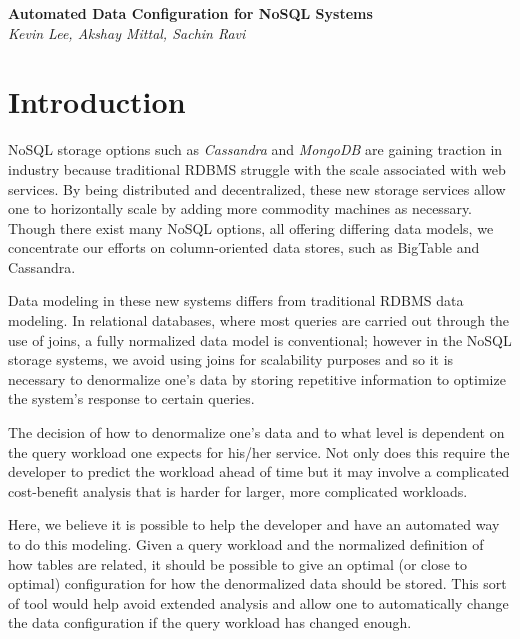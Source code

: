 \documentclass[10pt]{article}
\begin{document}
\pagestyle{plain}

\begin{center}
  \Large\textbf{Automated Data Configuration for NoSQL Systems}\\
  \large\textit{Kevin Lee, Akshay Mittal, Sachin Ravi}
\end{center}

\bigskip

\section{Introduction}
NoSQL storage options such as \emph{Cassandra} and \emph{MongoDB} are gaining traction in industry because traditional
RDBMS struggle with the scale associated with web services. By being distributed and decentralized, these new storage 
services allow one to horizontally scale by adding more commodity machines as necessary. Though there exist many NoSQL
options, all offering differing data models, we concentrate our efforts on column-oriented data stores, such as BigTable
and Cassandra.

Data modeling in these new systems differs from traditional RDBMS data modeling. In relational databases, where most queries
are carried out through the use of joins, a fully normalized data model is conventional; however in the NoSQL storage systems, 
we avoid using joins for scalability purposes and so it is necessary to denormalize one's data by storing repetitive information 
to optimize the system's response to certain queries.

The decision of how to denormalize one's data and to what level is dependent on the query workload one expects for his/her service.
Not only does this require the developer to predict the workload ahead of time but it may involve a complicated cost-benefit analysis that
is harder for larger, more complicated workloads.

Here, we believe it is possible to help the developer and have an automated way to do this modeling. Given a query workload and 
the normalized definition of how tables are related, it should be possible to give an optimal (or close to optimal) configuration 
for how the denormalized data should be stored. This sort of tool would help avoid extended analysis and allow one to automatically
change the data configuration if the query workload has changed enough.
\end{document}
